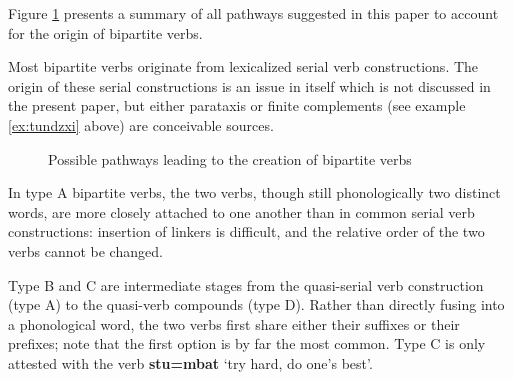 \documentclass[11pt]{article}
\newcommand{\ipa}[1]{{\phon\textbf{#1}}}
\newcommand{\jpg}[2]{\ipa{#1} `#2'}
\begin{document}
Figure \ref{fig:bipartite.pathways} presents a summary of all pathways suggested in this paper to account for the origin of bipartite verbs.

Most bipartite verbs originate from lexicalized serial verb constructions. The origin of these serial constructions is an issue in itself which is not discussed in the present paper, but either parataxis or finite complements (see example \ref{ex:tundzxi} above) are conceivable sources.


   \begin{figure}[H]
   \caption{Possible pathways leading to the creation of bipartite verbs} \label{fig:bipartite.pathways}  
\end{figure}

In type A bipartite verbs, the two verbs, though still phonologically two distinct words, are more closely attached to one another than in common serial verb constructions: insertion of linkers is difficult, and the relative order of the two verbs cannot be changed.

Type B and C are intermediate stages from the quasi-serial verb construction (type A) to the quasi-verb compounds (type D). Rather than directly fusing into a phonological word, the two verbs first share either their suffixes or their prefixes; note that the first option is by far the most common. Type C is only attested with the verb \jpg{stu=mbat}{try hard, do one's best}.
\end{document}
